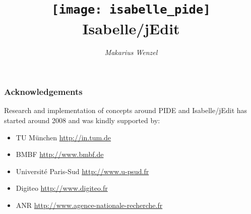 \documentclass[12pt,a4paper]{report}
\title{\texttt{[image: isabelle\_pide]} \\[4ex] Isabelle/jEdit}
\author{\emph{Makarius Wenzel}}
\begin{document}
\maketitle


\subsubsection*{Acknowledgements}

Research and implementation of concepts around PIDE and Isabelle/jEdit has
started around 2008 and was kindly supported by:
\begin{itemize}
\item TU M\"unchen \url{http://in.tum.de}
\item BMBF \url{http://www.bmbf.de}
\item Universit\'e Paris-Sud \url{http://www.u-psud.fr}
\item Digiteo \url{http://www.digiteo.fr}
\item ANR \url{http://www.agence-nationale-recherche.fr}
\end{itemize}


 \tableofcontents \clearfirst



\begingroup
  \tocentry{\bibname}
   \small\raggedright\frenchspacing
  
\endgroup

\tocentry{\indexname}
\printindex
\end{document}
